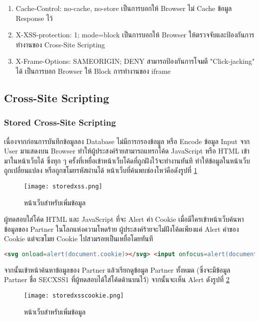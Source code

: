 \begin{enumerate}
	\itemsep0em 
	\item Cache-Control: no-cache, no-store เป็นการบอกให้ Browser ไม่ Cache ข้อมูล Response ไว้
	\item X-XSS-protection: 1; mode=block เป็นการบอกให้ Browser ให้ตรวจจับและป้องกันการทำงานของ Cross-Site Scripting
	\item X-Frame-Options: SAMEORIGIN; DENY สามารถป้องกันการโจมตี "Click-jacking" ได้ เป็นการบอก Browser ให้ Block การทำงานของ iframe
\end{enumerate}

\subsection{Cross-Site Scripting}

\subsubsection{Stored Cross-Site Scripting}

เนื่องจากก่อนการบันทึกข้อมูลลง Database ไม่มีการกรองข้อมูล หรือ Encode ข้อมูล Input จาก User มาแสดงบน Browser ทำให้ผู้ประสงค์ร้ายสามารถแทรกโค้ด JavaScript หรือ HTML เข้ามาในหน้าเว็บได้ ซึ่งทุก ๆ ครั้งที่เหยื่อเข้าหน้าเว็บโค้ดที่ถูกฝังไว้จะทำงานทันที ทำให้ข้อมูลในหน้าเว็บถูกเปลี่ยนแปลง หรือถูกขโมยรหัสผ่านได้ หน้าเว็บที่ค้นพบช่องโหว่คือดังรูปที่ \ref{Fig:storedxss.png}

\begin{figure}[h]
	\centering
	\texttt{[image: storedxss.png]}
	\caption{หน้าเว็บสำหรับเพิ่มข้อมูล}
	\label{Fig:storedxss.png}
\end{figure}

ผู้ทดสอบใส่โค้ด HTML และ JavaScript ที่จะ Alert ค่า Cookie เมื่อมีใครเข้าหน้าเว็บค้นหาข้อมูลของ Partner ในโลกแห่งความโหดร้าย ผู้ประสงค์ร้ายจะไม่ฝังโค้ดเพียงแค่ Alert ค่าของ Cookie แต่จะขโมย Cookie ไปสวมรอยเป็นเหยื่อโดยทันที

 \begin{lstlisting}[language=html,numbers=none] 
<svg onload=alert(document.cookie)></svg> <input onfocus=alert(document.cookie) autofocus>
\end{lstlisting}

จากนั้นเข้าหน้าค้นหาข้อมูลของ Partner แล้วเรียกดูข้อมูล Partner ทั้งหมด (ซึ่งจะมีข้อมูล Partner ชื่อ SECXSS1 ที่ผู้ทดสอบได้ใส่โค้ดด้านบนไว้) จากนั้นจะเห็น Alert ดังรูปที่ \ref{Fig:storedxsscookie.png}

\begin{figure}[h]
	\centering
	\texttt{[image: storedxsscookie.png]}
	\caption{หน้าเว็บสำหรับเพิ่มข้อมูล}
	\label{Fig:storedxsscookie.png}
\end{figure}


